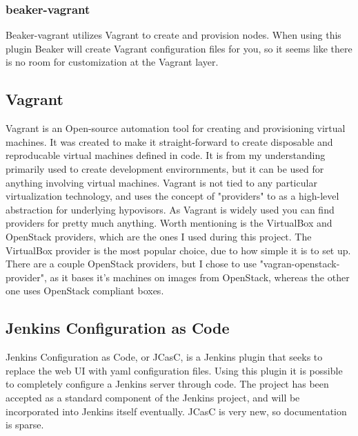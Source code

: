 \subsubsection{beaker-vagrant}

Beaker-vagrant utilizes Vagrant to create and provision nodes. When using this plugin Beaker will create Vagrant configuration files for you, so it seems like there is no room for customization at the Vagrant layer.

\subsection{Vagrant}

Vagrant is an Open-source automation tool for creating and provisioning virtual machines. It was created to make it straight-forward to create disposable and reproducable virtual machines defined in code. It is from my understanding primarily used to create development envirornments, but it can be used for anything involving virtual machines. Vagrant is not tied to any particular virtualization technology, and uses the concept of "providers" to as a high-level abstraction for underlying hypovisors. As Vagrant is widely used you can find providers for pretty much anything. Worth mentioning is the VirtualBox and OpenStack providers, which are the ones I used during this project. The VirtualBox provider is the most popular choice, due to how simple it is to set up. There are a couple OpenStack providers, but I chose to use "vagran-openstack-provider", as it bases it's machines on images from OpenStack, whereas the other one uses OpenStack compliant boxes.

\subsection{Jenkins Configuration as Code}

Jenkins Configuration as Code, or JCasC, is a Jenkins plugin that seeks to replace the web UI with yaml configuration files. Using this plugin it is possible to completely configure a Jenkins server through code. The project has been accepted as a standard component of the Jenkins project, and will be incorporated into Jenkins itself eventually. JCasC is very new, so documentation is sparse.


